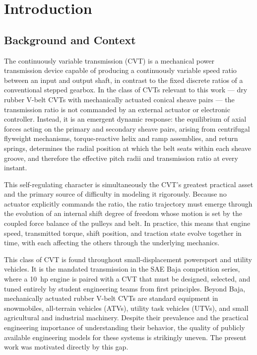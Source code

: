 \documentclass[11pt]{article}
\numberwithin{equation}{section}
\begin{document}
\newpage
\tableofcontents
\newpage

\section{Introduction}
\label{sec:introduction}

\subsection{Background and Context}
\label{sec:intro_background}

The continuously variable transmission (CVT) is a mechanical power transmission device capable of producing a continuously variable speed ratio between an input and output shaft, in contrast to the fixed discrete ratios of a conventional stepped gearbox. In the class of CVTs relevant to this work --- dry rubber V-belt CVTs with mechanically actuated conical sheave pairs --- the transmission ratio is not commanded by an external actuator or electronic controller. Instead, it is an emergent dynamic response: the equilibrium of axial forces acting on the primary and secondary sheave pairs, arising from centrifugal flyweight mechanisms, torque-reactive helix and ramp assemblies, and return springs, determines the radial position at which the belt seats within each sheave groove, and therefore the effective pitch radii and transmission ratio at every instant.

This self-regulating character is simultaneously the CVT's greatest practical
asset and the primary source of difficulty in modeling it rigorously. Because
no actuator explicitly commands the ratio, the ratio trajectory must emerge
through the evolution of an internal shift degree of freedom whose motion is
set by the coupled force balance of the pulleys and belt. In practice, this
means that engine speed, transmitted torque, shift position, and traction
state evolve together in time, with each affecting the others through the
underlying mechanics.


This class of CVT is found throughout small-displacement powersport and utility vehicles. It is the mandated transmission in the SAE Baja competition series, where a 10~hp engine is paired with a CVT that must be designed, selected, and tuned entirely by student engineering teams from first principles. Beyond Baja, mechanically actuated rubber V-belt CVTs are standard equipment in snowmobiles, all-terrain vehicles (ATVs), utility task vehicles (UTVs), and small agricultural and industrial machinery. Despite their prevalence and the practical engineering importance of understanding their behavior, the quality of publicly available engineering models for these systems is strikingly uneven. The present work was motivated directly by this gap.
\end{document}
